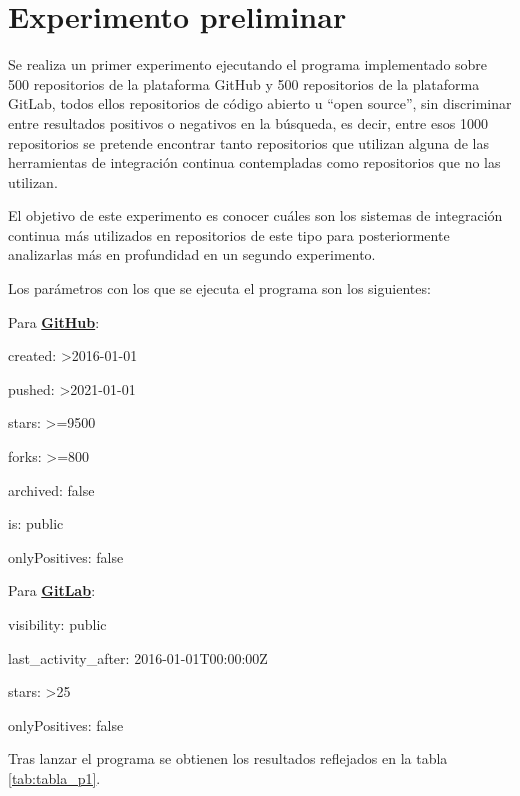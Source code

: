 \section{Experimento preliminar}
Se realiza un primer experimento ejecutando el programa implementado sobre 500 repositorios de la plataforma GitHub y 500 repositorios de la plataforma GitLab, todos ellos repositorios de código abierto u ``open source'', sin discriminar entre resultados positivos o negativos en la búsqueda, es decir, entre esos 1000 repositorios se pretende encontrar tanto repositorios que utilizan alguna de las herramientas de integración continua contempladas como repositorios que no las utilizan.

El objetivo de este experimento es conocer cuáles son los sistemas de integración continua más utilizados en repositorios de este tipo para posteriormente analizarlas más en profundidad en un segundo experimento.

Los parámetros con los que se ejecuta el programa son los siguientes:
\begin{compactitem}
    \item Para \textbf{\underline{GitHub}}:
    \begin{compactitem}
        \item created: \textgreater2016-01-01
        \item pushed: \textgreater2021-01-01
        \item stars: \textgreater=9500
        \item forks: \textgreater=800
        \item archived: false
        \item is: public
        \item onlyPositives: false
    \end{compactitem}
    \item Para \textbf{\underline{GitLab}}:
    \begin{compactitem}
        \item visibility: public
        \item last\_activity\_after: 2016-01-01T00:00:00Z
        \item stars: \textgreater25
        \item onlyPositives: false
    \end{compactitem}
\end{compactitem}

Tras lanzar el programa se obtienen los resultados reflejados en la tabla \ref{tab:tabla_p1}.

